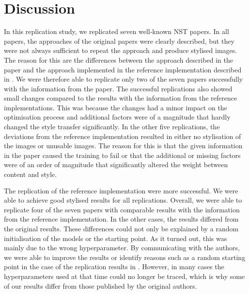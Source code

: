 \section{Discussion}

In this replication study, we replicated seven well-known \gls{NST} papers. In all papers, the approaches of the original papers were clearly described, but they were not always sufficient to repeat the approach and produce stylised images. The reason for this are the differences between the approach described in the paper and the approach implemented in the reference implementation described in . We were therefore able to replicate only two of the seven papers successfully with the information from the paper. The successful replications also showed small changes compared to the results with the information from the reference implementations. This was because the changes had a minor impact on the optimisation process and additional factors were of a magnitude that hardly changed the style transfer significantly. In the other five replications, the deviations from the reference implementation resulted in either no stylisation of the images or unusable images. The reason for this is that the given information in the paper caused the training to fail or that the additional or missing factors were of an order of magnitude that significantly altered the weight between content and style.

The replication of the reference implementation were more successful. We were able to achieve good stylised results for all replications. Overall, we were able to replicate four of the seven papers with comparable results with the information from the reference implementation. In the other cases, the results differed from the original results. These differences could not only be explained by a random initialisation of the models or the starting point. As it turned out, this was mainly due to the wrong hyperparameter. By communicating with the authors, we were able to improve the results or identify reasons such as a random starting point in the case of the replication results in . However, in many cases the hyperparameters used at that time could no longer be traced, which is why some of our results differ from those published by the original authors.

